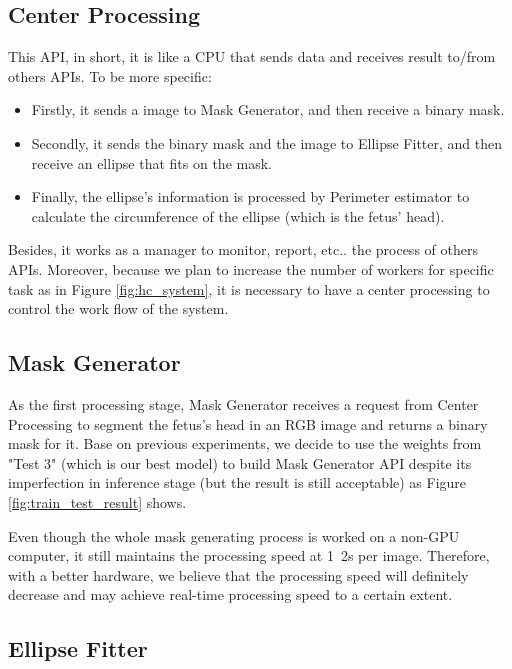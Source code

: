 \subsection{Center Processing}
\noindent

	This API, in short, it is like a CPU that sends data and receives result to/from others APIs. To be more specific:
	
	\begin{itemize}
		\item Firstly, it sends a image to Mask Generator, and then receive a binary mask.
		\item Secondly, it sends the binary mask and the image to Ellipse Fitter, and then receive an ellipse that fits on the mask.
		\item Finally, the ellipse's information is processed by Perimeter estimator to calculate the circumference of the ellipse (which is the fetus' head).
	\end{itemize}
	
	Besides, it works as a manager to monitor, report, etc.. the process of others APIs. Moreover, because we plan to increase the number of workers for specific task as in Figure \ref{fig:hc_system}, it is necessary to have a center processing to control the work flow of the system.

\subsection{Mask Generator}
\noindent
	
	As the first processing stage, Mask Generator receives a request from Center Processing to segment the fetus's head in an RGB image and returns a binary mask for it. Base on previous experiments, we decide to use the weights from "Test 3" (which is our best model) to build Mask Generator API despite its imperfection in inference stage (but the result is still acceptable) as Figure \ref{fig:train_test_result} shows. 
	
	Even though the whole mask generating process is worked on a non-GPU computer, it still maintains the processing speed at 1~2s per image. Therefore, with a better hardware, we believe that the processing speed will definitely decrease and may achieve real-time processing speed to a certain extent.
	
\subsection{Ellipse Fitter}
\noindent

